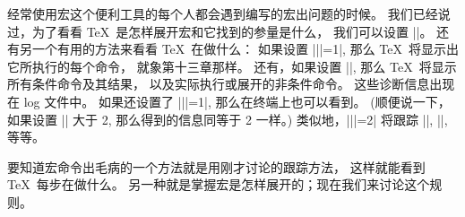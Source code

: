 {{{{{{{{%
\ddanger 经常使用宏这个便利工具的每个人都会遇到编写的宏出问题的时候。%
我们已经说过，为了看看 \TeX\ 是怎样展开宏和它找到的参量是什么，
我们可以设置 ||。%
还有另一个有用的方法来看看 \TeX\ 在做什么：
如果设置 |\tracingcommands||=1|, 那么 \TeX\ 将显示出它所执行的每个命令，
就象第十三章那样。%
还有，如果设置 ||, 那么 \TeX\ 将显示所有条件命令及其结果，
以及实际执行或展开的非条件命令。%
这些诊断信息出现在 log 文件中。%
如果还设置了 |\tracingonline||=1|, 那么在终端上也可以看到。%
(顺便说一下，如果设置 |\tracingcommands| 大于 2, 那么得到的信息同等于 2 一样。)
类似地，|\tracingmacros||=2| 将跟踪 |\output|, |\everypar|, 等等。

\ddanger 要知道宏命令出毛病的一个方法就是用刚才讨论的跟踪方法，
这样就能看到 \TeX\ 每步在做什么。%
另一种就是掌握宏是怎样展开的；现在我们来讨论这个规则。

}}}}}}}}
